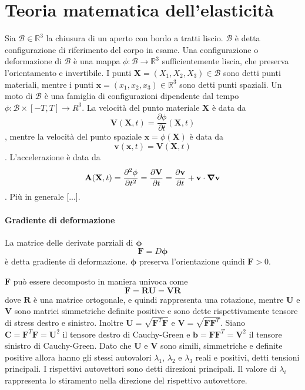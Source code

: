 \section{Teoria matematica dell'elasticità}
Sia $\mathcal{B} \in \mathbb{R}^3$ la chiusura di un aperto con bordo a tratti liscio. $\mathcal{B}$ è detta configurazione di riferimento del corpo in esame.
Una configurazione o deformazione di $\mathcal{B}$ è una mappa $\phi: \mathcal{B} \to \mathbb{R}^3$ sufficientemente liscia, che preserva l'orientamento e invertibile. I punti $\mathbf{X}=(X_1,X_2,X_3) \in \mathcal{B}$ sono detti punti materiali, mentre i punti $\mathbf{x}=(x_1,x_2,x_3) \in \mathbb{R}^3$ sono detti punti spaziali. 
Un moto di $\mathcal{B}$ è una famiglia di configurazioni dipendente dal tempo $\phi: \mathcal{B} \times [-T,T] \to R^3$.
La velocità del punto materiale $\mathbf{X}$ è data da 
$$\mathbf{V}(\mathbf{X},t) = \frac{\partial \phi}{\partial t}(\mathbf{X},t)$$,
mentre la velocità del punto spaziale $\mathbf{x}=\phi(\mathbf{X})$ è data da
$$\mathbf{v}(\mathbf{x},t) = \mathbf{V}(\mathbf{X},t)$$.
L'accelerazione è data da
$$\mathbf{A}(\mathbf{X},t) = \frac{\partial^2 \phi}{\partial t^2} = \frac{\partial \mathbf{V}}{\partial t} = \frac{\partial \mathbf{v}}{\partial t}+\mathbf{v}\cdot\boldsymbol{\nabla}\mathbf{v}$$.
Più in generale [...].
\paragraph{Gradiente di deformazione}
La matrice delle derivate parziali di $\boldsymbol{\phi}$ 
$$ \mathbf{F} = D\boldsymbol{\phi}$$
è detta gradiente di deformazione.
$\boldsymbol{\phi}$ preserva l'orientazione quindi $\mathbf{F} > 0$. 

$\mathbf{F}$ può essere decomposto in maniera univoca come 
$$\mathbf{F}=\mathbf{R}\mathbf{U}=\mathbf{V}\mathbf{R}$$
dove $\mathbf{R}$ è una matrice ortogonale, e quindi rappresenta una rotazione, mentre $\mathbf{U}$ e $\mathbf{V}$ sono matrici simmetriche definite positive e sono dette rispettivamente tensore di stress destro e sinistro. 
Inoltre $\mathbf{U}=\sqrt{\mathbf{F}^T\mathbf{F}}$ e $\mathbf{V}=\sqrt{\mathbf{F}\mathbf{F}^T}$.
Siano $\mathbf{C}=\mathbf{F}^T\mathbf{F}=\mathbf{U}^2$ il tensore destro di Cauchy-Green e $\mathbf{b}=\mathbf{F}\mathbf{F}^T=\mathbf{V}^2$ il tensore sinistro di Cauchy-Green.
Dato che $\mathbf{U}$ e $\mathbf{V}$ sono simili, simmetriche e definite positive allora hanno gli stessi autovalori $\lambda_1$, $\lambda_2$ e $\lambda_3$ reali e positivi, detti tensioni principali. I rispettivi autovettori sono detti direzioni principali. Il valore di $\lambda_i$ rappresenta lo stiramento nella direzione del rispettivo autovettore.
